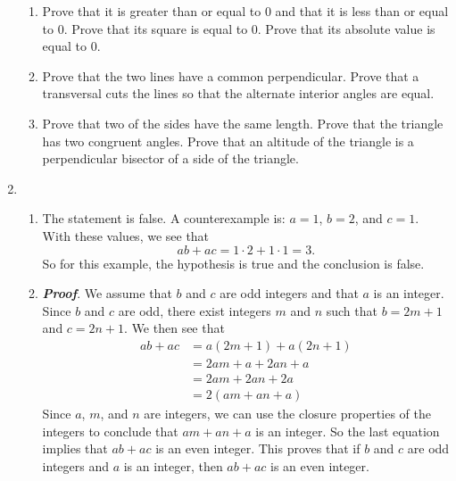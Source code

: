 \begin{enumerate}
\begin{enumerate}
\item Prove that it is greater than or equal to 0 and that it is less than or equal to 0.  Prove that its square is equal to 0.  Prove that its absolute value is equal to 0.

\item Prove that the two lines have a common perpendicular.  Prove that a transversal cuts the lines so that the alternate interior angles are equal.
\item Prove that two of the sides have the same length.  Prove that the triangle has two congruent angles.  Prove that an altitude of the triangle is a perpendicular bisector of a side of the triangle.
\end{enumerate}




\item \begin{enumerate} 
\item The statement is false.  A counterexample is:  $a = 1$, $b = 2$, and $c = 1$.  With these values, we see that
\[
ab + ac = 1 \cdot 2 + 1 \cdot 1 = 3.
\]
So for this example, the hypothesis is true and the conclusion is false.

\item \emph{\textbf{Proof}}.  We assume that $b$ and $c$ are odd integers and that $a$ is an integer.  Since $b$ and $c$ are odd, there exist integers $m$ and $n$ such that $b = 2m + 1$ and $c = 2n + 1$.  We then see that
\begin{align*}
ab + ac &= a(2m + 1) + a(2n + 1) \\
        &= 2am + a + 2an + a \\
        &= 2am + 2an + 2a \\
        &= 2(am + an + a)
\end{align*}
Since $a$, $m$, and $n$ are integers, we can use the closure properties of the integers to conclude that $am + an + a$ is an integer.  So the last equation implies that $ab + ac$ is an even integer.  This proves that if $b$ and $c$ are odd integers and $a$ is an integer, then $ab + ac$ is an even integer.
\end{enumerate}



\end{enumerate}

